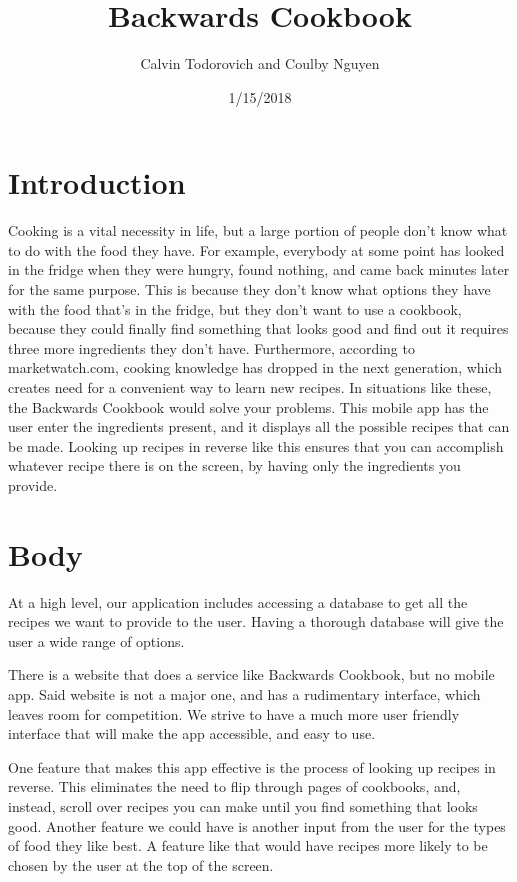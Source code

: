 \documentclass{article}
\title{Backwards Cookbook}
\author{Calvin Todorovich and Coulby Nguyen}
\date{1/15/2018}
\begin{document}
\maketitle

\section{Introduction}

Cooking is a vital necessity in life, but a large portion of people don't know what to do with the food they have. For example, everybody at some point has looked in the fridge when they were hungry, found nothing, and came back minutes later for the same purpose. This is because they don't know what options they have with the food that's in the fridge, but they don't want to use a cookbook, because they could finally find something that looks good and find out it requires three more ingredients they don't have.  Furthermore, according to marketwatch.com, cooking knowledge has dropped in the next generation, which creates need for a convenient way to learn new recipes. In situations like these, the Backwards Cookbook would solve your problems. This mobile app has the user enter the ingredients present, and it displays all the possible recipes that can be made. Looking up recipes in reverse like this ensures that you can accomplish whatever recipe there is on the screen, by having only the ingredients you provide. 


\section{Body}

At a high level, our application includes accessing a database to get all the recipes we want to provide to the user. Having a thorough database will give the user a wide range of options. 

There is a website that does a service like Backwards Cookbook, but no mobile app. Said website is not a major one, and has a rudimentary interface, which leaves room for competition. We strive to have a much more user friendly interface that will make the app accessible, and easy to use. 

One feature that makes this app effective is the process of looking up recipes in reverse. This eliminates the need to flip through pages of cookbooks, and, instead, scroll over recipes you can make until you find something that looks good. Another feature we could have is another input from the user for the types of food they like best. A feature like that would have recipes more likely to be chosen by the user at the top of the screen. 
\end{document}
